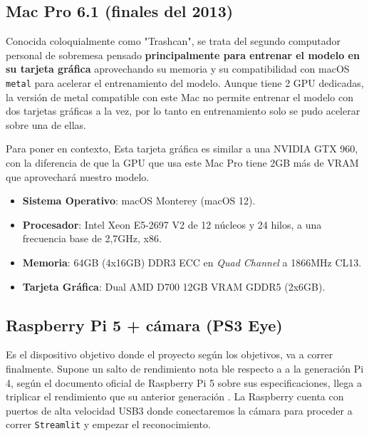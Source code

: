 \subsection{Mac Pro 6.1 (finales del 2013)} 


Conocida coloquialmente como "Trashcan", se trata del segundo computador personal de sobremesa pensado \textbf{principalmente para entrenar el modelo en su tarjeta gráfica} aprovechando su memoria y su compatibilidad con macOS \texttt{metal} para acelerar el entrenamiento del modelo. Aunque tiene 2 GPU dedicadas, la versión de metal compatible con este Mac no permite entrenar el modelo con dos tarjetas gráficas a la vez, por lo tanto en entrenamiento solo se pudo acelerar sobre una de ellas.

Para poner en contexto, Esta tarjeta gráfica es similar a una NVIDIA GTX 960, con la diferencia de que la GPU que usa este Mac Pro tiene 2GB más de VRAM que aprovechará nuestro modelo.

\begin{itemize}
\tightlist
    \item \textbf{Sistema Operativo}: macOS Monterey (macOS 12).
    \item \textbf{Procesador}: Intel Xeon E5-2697 V2 de 12 núcleos y 24 hilos, a una frecuencia base de 2,7GHz, x86.
    \item \textbf{Memoria}: 64GB (4x16GB) DDR3 ECC en \textit{Quad Channel} a 1866MHz CL13.
    \item \textbf{Tarjeta Gráfica}: Dual AMD D700 12GB VRAM GDDR5 (2x6GB). 
\end{itemize}

\subsection{Raspberry Pi 5 + cámara (PS3 Eye)}


Es el dispositivo objetivo donde el proyecto según los objetivos, va a correr finalmente. Supone un salto de rendimiento nota ble respecto a a la generación Pi 4, según el documento oficial de Raspberry Pi 5 sobre sus especificaciones, llega a triplicar el rendimiento que su anterior generación \cite{art:raspberry_pi_5}. La Raspberry cuenta con puertos de alta velocidad USB3 donde conectaremos la cámara para proceder a correr \texttt{Streamlit} y empezar el reconocimiento.

